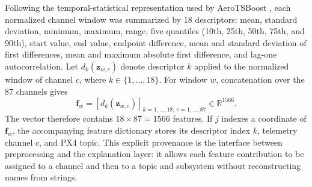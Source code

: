 Following the temporal-statistical representation used by AeroTSBoost \cite{wei2026aerotsboost}, each normalized channel window was summarized by 18 descriptors: mean, standard deviation, minimum, maximum, range, five quantiles (10th, 25th, 50th, 75th, and 90th), start value, end value, endpoint difference, mean and standard deviation of first differences, mean and maximum absolute first difference, and lag-one autocorrelation. Let $d_k(\mathbf{z}_{w,c})$ denote descriptor $k$ applied to the normalized window of channel $c$, where $k\in\{1,\ldots,18\}$. For window $w$, concatenation over the 87 channels gives
\begin{equation}
\mathbf{f}_w=\left[d_k\!\left(\mathbf{z}_{w,c}\right)\right]_{k=1,\ldots,18;\,c=1,\ldots,87}\in\mathbb{R}^{1566}.
\label{eq:window_feature_vector}
\end{equation}
The vector therefore contains $18\times87=1566$ features. If $j$ indexes a coordinate of $\mathbf{f}_w$, the accompanying feature dictionary stores its descriptor index $k$, telemetry channel $c$, and PX4 topic. This explicit provenance is the interface between preprocessing and the explanation layer: it allows each feature contribution to be assigned to a channel and then to a topic and subsystem without reconstructing names from strings.
